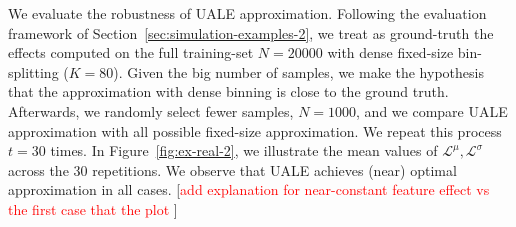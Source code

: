\documentclass[twoside]{article}
\newcommand{\todo}[1]{[\textcolor{red}{#1}]}
\begin{document}
We evaluate the robustness of UALE approximation. Following the
evaluation framework of Section~\ref{sec:simulation-examples-2}, we
treat as ground-truth the effects computed on the full training-set
\(N=20000\) with dense fixed-size bin-splitting (\(K=80\)). Given the
big number of samples, we make the hypothesis that the approximation
with dense binning is close to the ground truth. Afterwards, we
randomly select fewer samples, \(N=1000\), and we compare UALE
approximation with all possible fixed-size approximation. We repeat
this process \(t=30\) times. In Figure~\ref{fig:ex-real-2}, we
illustrate the mean values of
\(\mathcal{L}^{\mu}, \mathcal{L}^{\sigma}\) across the 30
repetitions. We observe that UALE achieves (near) optimal
approximation in all cases. \todo{add explanation for near-constant
  feature effect vs the first case that the plot }
\end{document}
